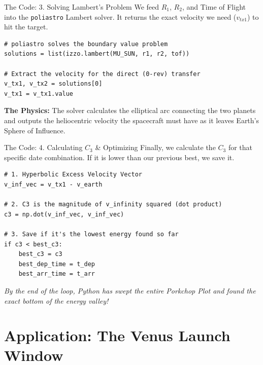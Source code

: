 \documentclass[11pt]{beamer}
\begin{document}
\begin{frame}[fragile]{The Code: 3. Solving Lambert's Problem}
    We feed $R_1$, $R_2$, and Time of Flight into the \texttt{poliastro} Lambert solver. It returns the exact velocity we need ($v_{tx1}$) to hit the target.
    
\begin{lstlisting}
# poliastro solves the boundary value problem
solutions = list(izzo.lambert(MU_SUN, r1, r2, tof))

# Extract the velocity for the direct (0-rev) transfer
v_tx1, v_tx2 = solutions[0]
v_tx1 = v_tx1.value 
\end{lstlisting}
    \vspace{0.2cm}
    \textbf{The Physics:} The solver calculates the elliptical arc connecting the two planets and outputs the heliocentric velocity the spacecraft must have as it leaves Earth's Sphere of Influence.
\end{frame}

\begin{frame}[fragile]{The Code: 4. Calculating $C_3$ \& Optimizing}
    Finally, we calculate the $C_3$ for that specific date combination. If it is lower than our previous best, we save it.
    
\begin{lstlisting}
# 1. Hyperbolic Excess Velocity Vector
v_inf_vec = v_tx1 - v_earth

# 2. C3 is the magnitude of v_infinity squared (dot product)
c3 = np.dot(v_inf_vec, v_inf_vec)

# 3. Save if it's the lowest energy found so far
if c3 < best_c3:
    best_c3 = c3
    best_dep_time = t_dep
    best_arr_time = t_arr
\end{lstlisting}
    \vspace{0.2cm}
    \textit{By the end of the loop, Python has swept the entire Porkchop Plot and found the exact bottom of the energy valley!}
\end{frame}

\section{Application: The Venus Launch Window}
\end{document}
